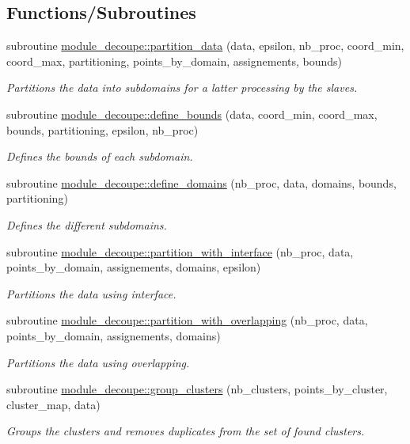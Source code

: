 \subsection*{Functions/\+Subroutines}
\begin{DoxyCompactItemize}
\item 
subroutine \hyperlink{namespacemodule__decoupe_a20e9d554b6d62aa1aac7be71c223132e}{module\+\_\+decoupe\+::partition\+\_\+data} (data, epsilon, nb\+\_\+proc, coord\+\_\+min, coord\+\_\+max, partitioning, points\+\_\+by\+\_\+domain, assignements, bounds)
\begin{DoxyCompactList}\small\item\em Partitions the data into subdomains for a latter processing by the slaves. \end{DoxyCompactList}\item 
subroutine \hyperlink{namespacemodule__decoupe_ab1bd43de3891732cdf5803c4d86544dd}{module\+\_\+decoupe\+::define\+\_\+bounds} (data, coord\+\_\+min, coord\+\_\+max, bounds, partitioning, epsilon, nb\+\_\+proc)
\begin{DoxyCompactList}\small\item\em Defines the bounds of each subdomain. \end{DoxyCompactList}\item 
subroutine \hyperlink{namespacemodule__decoupe_afc4d3c1d1e2c287779200be5cf9d8205}{module\+\_\+decoupe\+::define\+\_\+domains} (nb\+\_\+proc, data, domains, bounds, partitioning)
\begin{DoxyCompactList}\small\item\em Defines the different subdomains. \end{DoxyCompactList}\item 
subroutine \hyperlink{namespacemodule__decoupe_a523f2f851f39859d9c60114c934b2d66}{module\+\_\+decoupe\+::partition\+\_\+with\+\_\+interface} (nb\+\_\+proc, data, points\+\_\+by\+\_\+domain, assignements, domains, epsilon)
\begin{DoxyCompactList}\small\item\em Partitions the data using interface. \end{DoxyCompactList}\item 
subroutine \hyperlink{namespacemodule__decoupe_a6f29dcc8367ffa44fa720260882fa04e}{module\+\_\+decoupe\+::partition\+\_\+with\+\_\+overlapping} (nb\+\_\+proc, data, points\+\_\+by\+\_\+domain, assignements, domains)
\begin{DoxyCompactList}\small\item\em Partitions the data using overlapping. \end{DoxyCompactList}\item 
subroutine \hyperlink{namespacemodule__decoupe_af5369423cd2f8c975e68cbc08c7b31c1}{module\+\_\+decoupe\+::group\+\_\+clusters} (nb\+\_\+clusters, points\+\_\+by\+\_\+cluster, cluster\+\_\+map, data)
\begin{DoxyCompactList}\small\item\em Groups the clusters and removes duplicates from the set of found clusters. \end{DoxyCompactList}\end{DoxyCompactItemize}
